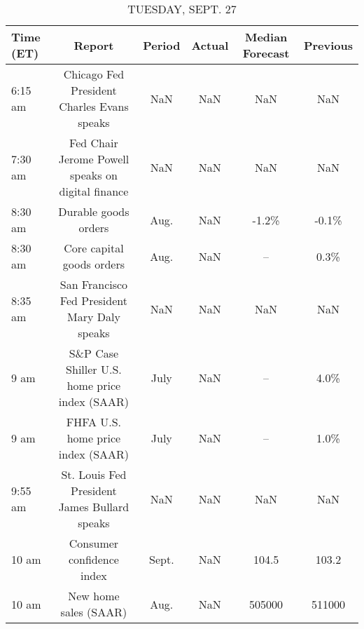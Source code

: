 \documentclass{book}
\begin{document}
  
  \begin{table}[htbp]%
  \caption{TUESDAY, SEPT. 27}%
  \centering%
  \begin{adjustbox}{width=1\textwidth}%
  \begin{tabular}{lccccc}
  \toprule
  Time (ET) &                                            Report & Period & Actual & Median Forecast & Previous \\
  \midrule
    6:15 am &        Chicago Fed President Charles Evans speaks &    NaN &    NaN &             NaN &      NaN \\
    7:30 am & Fed Chair Jerome Powell speaks on digital finance &    NaN &    NaN &             NaN &      NaN \\
    8:30 am &                              Durable goods orders &   Aug. &    NaN &           -1.2\% &    -0.1\% \\
    8:30 am &                         Core capital goods orders &   Aug. &    NaN &              -- &     0.3\% \\
    8:35 am &      San Francisco Fed President Mary Daly speaks &    NaN &    NaN &             NaN &      NaN \\
       9 am &     S\&P Case Shiller U.S. home price index (SAAR) &   July &    NaN &              -- &     4.0\% \\
       9 am &                 FHFA U.S. home price index (SAAR) &   July &    NaN &              -- &     1.0\% \\
    9:55 am &      St. Louis Fed President James Bullard speaks &    NaN &    NaN &             NaN &      NaN \\
      10 am &                         Consumer confidence index &  Sept. &    NaN &           104.5 &    103.2 \\
      10 am &                             New home sales (SAAR) &   Aug. &    NaN &          505000 &   511000 \\
  \bottomrule
  \end{tabular}
  \end{adjustbox}%
  \end{table}
  
  
\end{document}

